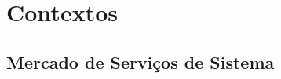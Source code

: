 \chapter{Contextos\label{ch:contextos}}

\section{Mercado de Serviços de Sistema \label{se:servicos_sistema}}


